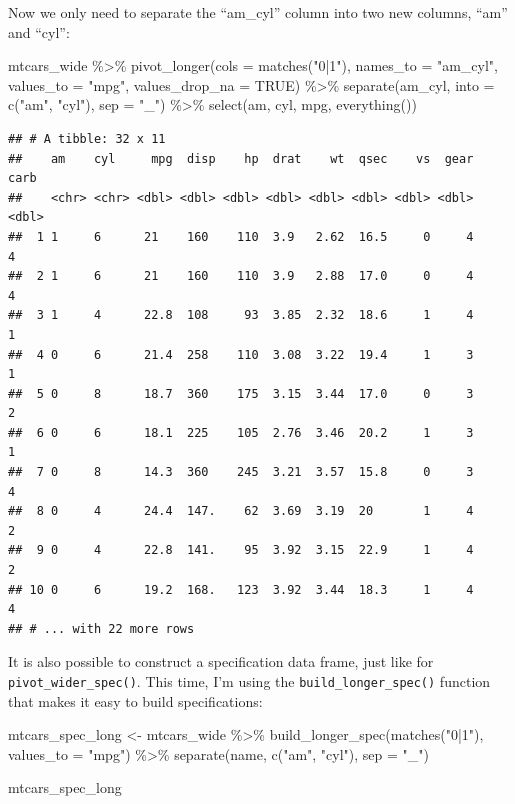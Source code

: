 \documentclass[
]{article}
\newenvironment{Shaded}{\begin{snugshade}}{\end{snugshade}}
\newcommand{\AttributeTok}[1]{\textcolor[rgb]{0.77,0.63,0.00}{#1}}
\newcommand{\ConstantTok}[1]{\textcolor[rgb]{0.00,0.00,0.00}{#1}}
\newcommand{\FunctionTok}[1]{\textcolor[rgb]{0.00,0.00,0.00}{#1}}
\newcommand{\NormalTok}[1]{#1}
\newcommand{\OtherTok}[1]{\textcolor[rgb]{0.56,0.35,0.01}{#1}}
\newcommand{\SpecialCharTok}[1]{\textcolor[rgb]{0.00,0.00,0.00}{#1}}
\newcommand{\StringTok}[1]{\textcolor[rgb]{0.31,0.60,0.02}{#1}}
\begin{document}
Now we only need to separate the ``am\_cyl'' column into two new columns, ``am'' and ``cyl'':

\begin{Shaded}
\begin{Highlighting}[]
\NormalTok{mtcars\_wide }\SpecialCharTok{\%\textgreater{}\%} 
  \FunctionTok{pivot\_longer}\NormalTok{(}\AttributeTok{cols =} \FunctionTok{matches}\NormalTok{(}\StringTok{"0|1"}\NormalTok{),}
               \AttributeTok{names\_to =} \StringTok{"am\_cyl"}\NormalTok{,}
               \AttributeTok{values\_to =} \StringTok{"mpg"}\NormalTok{,}
               \AttributeTok{values\_drop\_na =} \ConstantTok{TRUE}\NormalTok{) }\SpecialCharTok{\%\textgreater{}\%} 
  \FunctionTok{separate}\NormalTok{(am\_cyl, }\AttributeTok{into =} \FunctionTok{c}\NormalTok{(}\StringTok{"am"}\NormalTok{, }\StringTok{"cyl"}\NormalTok{), }\AttributeTok{sep =} \StringTok{"\_"}\NormalTok{) }\SpecialCharTok{\%\textgreater{}\%} 
  \FunctionTok{select}\NormalTok{(am, cyl, mpg, }\FunctionTok{everything}\NormalTok{())}
\end{Highlighting}
\end{Shaded}

\begin{verbatim}
## # A tibble: 32 x 11
##    am    cyl     mpg  disp    hp  drat    wt  qsec    vs  gear  carb
##    <chr> <chr> <dbl> <dbl> <dbl> <dbl> <dbl> <dbl> <dbl> <dbl> <dbl>
##  1 1     6      21    160    110  3.9   2.62  16.5     0     4     4
##  2 1     6      21    160    110  3.9   2.88  17.0     0     4     4
##  3 1     4      22.8  108     93  3.85  2.32  18.6     1     4     1
##  4 0     6      21.4  258    110  3.08  3.22  19.4     1     3     1
##  5 0     8      18.7  360    175  3.15  3.44  17.0     0     3     2
##  6 0     6      18.1  225    105  2.76  3.46  20.2     1     3     1
##  7 0     8      14.3  360    245  3.21  3.57  15.8     0     3     4
##  8 0     4      24.4  147.    62  3.69  3.19  20       1     4     2
##  9 0     4      22.8  141.    95  3.92  3.15  22.9     1     4     2
## 10 0     6      19.2  168.   123  3.92  3.44  18.3     1     4     4
## # ... with 22 more rows
\end{verbatim}

It is also possible to construct a specification data frame, just like for \texttt{pivot\_wider\_spec()}.
This time, I'm using the \texttt{build\_longer\_spec()} function that makes it easy to build specifications:

\begin{Shaded}
\begin{Highlighting}[]
\NormalTok{mtcars\_spec\_long }\OtherTok{\textless{}{-}}\NormalTok{ mtcars\_wide }\SpecialCharTok{\%\textgreater{}\%}
  \FunctionTok{build\_longer\_spec}\NormalTok{(}\FunctionTok{matches}\NormalTok{(}\StringTok{"0|1"}\NormalTok{),}
                    \AttributeTok{values\_to =} \StringTok{"mpg"}\NormalTok{) }\SpecialCharTok{\%\textgreater{}\%}
  \FunctionTok{separate}\NormalTok{(name, }\FunctionTok{c}\NormalTok{(}\StringTok{"am"}\NormalTok{, }\StringTok{"cyl"}\NormalTok{), }\AttributeTok{sep =} \StringTok{"\_"}\NormalTok{)}

\NormalTok{mtcars\_spec\_long}
\end{Highlighting}
\end{Shaded}
\end{document}
